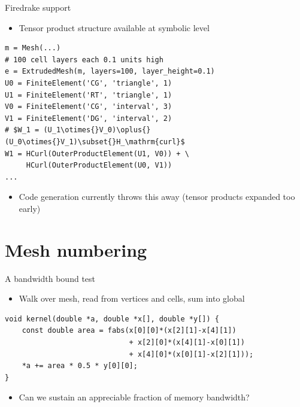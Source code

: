 \documentclass[bigger]{beamer}
\begin{document}
\begin{frame}[fragile,label={sec:orgheadline17}]{Firedrake support}
 \begin{itemize}
\item Tensor product structure available at symbolic level
\end{itemize}
\begin{verbatim}
m = Mesh(...)
# 100 cell layers each 0.1 units high
e = ExtrudedMesh(m, layers=100, layer_height=0.1)
U0 = FiniteElement('CG', 'triangle', 1)
U1 = FiniteElement('RT', 'triangle', 1)
V0 = FiniteElement('CG', 'interval', 3)
V1 = FiniteElement('DG', 'interval', 2)
# $W_1 = (U_1\otimes{}V_0)\oplus{}(U_0\otimes{}V_1)\subset{}H_\mathrm{curl}$
W1 = HCurl(OuterProductElement(U1, V0)) + \
     HCurl(OuterProductElement(U0, V1))
...
\end{verbatim}
\begin{itemize}
\item Code generation currently throws this away (tensor products expanded
too early)
\end{itemize}
\end{frame}

\section{Mesh numbering}
\label{sec:orgheadline22}
\begin{frame}[fragile,label={sec:orgheadline19}]{A bandwidth bound test}
 \begin{itemize}
\item Walk over mesh, read from vertices and cells, sum into global
\end{itemize}
\begin{verbatim}
void kernel(double *a, double *x[], double *y[]) {
    const double area = fabs(x[0][0]*(x[2][1]-x[4][1])
                             + x[2][0]*(x[4][1]-x[0][1])
                             + x[4][0]*(x[0][1]-x[2][1]));
    *a += area * 0.5 * y[0][0];
}
\end{verbatim}
\begin{itemize}
\item Can we sustain an appreciable fraction of memory bandwidth?
\end{itemize}
\end{frame}
\end{document}
